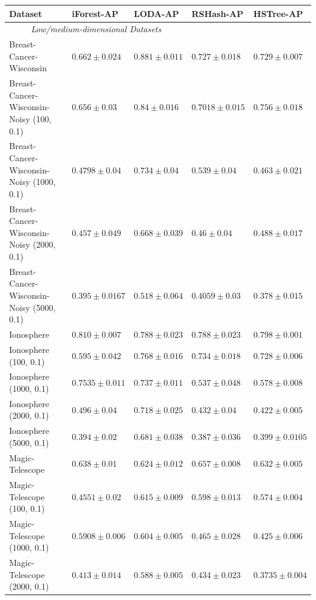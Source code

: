 \begin{table}[ht!]
    \centering
		\begin{tabular}{lllll}
				\toprule
				\textbf{Dataset} & \textbf{iForest-AP} & \textbf{LODA-AP} & \textbf{RSHash-AP} & \textbf{HSTree-AP}	\\
				\midrule
				\multicolumn{3}{c}{\textit{Low/medium-dimensional Datasets}}\\
				Breast-Cancer-Wisconsin & $0.662 \pm 0.024$ & $ 0.881 \pm 0.011$ & $0.727 \pm 0.018$ & $0.729 \pm 0.007$\\
				Breast-Cancer-Wisconsin-Noisy (100, 0.1) & $0.656 \pm 0.03$ & $ 0.84 \pm 0.016$ & $ 0.7018 \pm 0.015$ & $ 0.756 \pm 0.018$	\\
				Breast-Cancer-Wisconsin-Noisy (1000, 0.1) & $0.4798 \pm 0.04$ & $ 0.734\pm 0.04$ & $0.539 \pm 0.04$ & $ 0.463 \pm 0.021$	\\
				Breast-Cancer-Wisconsin-Noisy (2000, 0.1) & $0.457 \pm 0.049$ & $ 0.668\pm 0.039$ & $0.46 \pm 0.04$ & $ 0.488 \pm 0.017$	\\
				Breast-Cancer-Wisconsin-Noisy (5000, 0.1) & $0.395 \pm 0.0167$ &  $0.518 \pm 0.064$ & $0.4059 \pm 0.03$ & $ 0.378 \pm 0.015$	\\
				\midrule
				Ionosphere & $0.810 \pm 0.007$ & $ 0.788 \pm 0.023$ & $ 0.788 \pm 0.023 $ & $0.798 \pm 0.001$\\
				Ionosphere (100, 0.1) & $0.595 \pm 0.042$ & $0.768 \pm 0.016$ & $0.734 \pm 0.018$ & $0.728 \pm 0.006$	\\
				Ionosphere (1000, 0.1) & $0.7535 \pm 0.011$ & $0.737 \pm 0.011$ & $0.537 \pm 0.048$ & $0.578 \pm 0.008$	\\
				Ionosphere (2000, 0.1) & $0.496 \pm 0.04$ &  $0.718 \pm 0.025$ & $0.432 \pm 0.04$ & $0.422 \pm 0.005$	\\
				Ionosphere (5000, 0.1) & $0.394 \pm 0.02$ &  $0.681 \pm 0.038$ & $0.387 \pm 0.036$ & $0.399 \pm 0.0105$	\\
				\midrule
				Magic-Telescope & $0.638 \pm 0.01$ & $0.624 \pm 0.012$ & $0.657 \pm 0.008$ & $0.632 \pm 0.005$\\
				Magic-Telescope (100, 0.1) & $0.4551 \pm 0.02$ & $0.615 \pm 0.009$ & $0.598 \pm 0.013$ & $0.574 \pm 0.004$	\\
				Magic-Telescope (1000, 0.1) & $0.5908 \pm 0.006$ & $0.604 \pm 0.005$ & $0.465 \pm 0.028$ & $0.425 \pm 0.006$	\\
				Magic-Telescope (2000, 0.1) & $0.413 \pm 0.014$  & $ 0.588 \pm 0.005$ & $0.434 \pm 0.023$ & $ 0.3735 \pm 0.004$	\\

\end{tabular}
\end{table}
